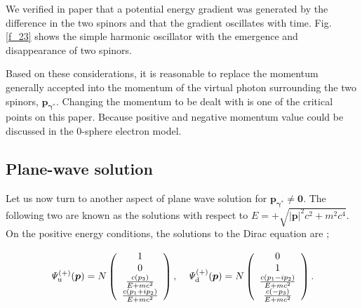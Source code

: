 \documentclass[%
 reprint,
 amsmath,amssymb,
 aps,
]{revtex4-1}
\numberwithin{equation}{section}%
\begin{document}
    We verified in paper \cite{Hanamura1} that a potential energy gradient was generated by the difference in the two spinors and that the gradient oscillates with time. Fig. \ref{f_23} shows the simple harmonic oscillator with the emergence and disappearance of two spinors.


    Based on these considerations, it is reasonable to replace the momentum generally accepted into the momentum of the virtual photon surrounding the two spinors, $ \bm{p_{\gamma^{*}}} $. Changing the momentum to be dealt with is one of the critical points on this paper. Because positive and negative momentum value could be discussed in the 0-sphere electron model. 






\subsection{
    \label{sec:Plane wave solution}
        Plane-wave solution}

    Let us now turn to another aspect of plane wave solution for $ \bm{p_{\gamma^{*}}} \neq \bm{0} $. The following two are known as the solutions with respect to $ E = + \sqrt{ |\bm{p}|^{2} c^{2} + m^{2} c^{4} } $. On the positive energy conditions, the solutions to the Dirac equation are \cite{Griffiths};

        \begin{align}
            {\it\Psi^{(+)}_{\mathrm{u}}} (\bm{p})
            = N
            \left( 
                \begin{array}{c}
                    1 \\
                    0 \\
                    \frac{c ( p_3 )}{E + m c^{2}} \\
                    \frac{c ( p_1 + i p_2 )}{E + m c^{2}} \\
                \end{array}
            \right)
            , \ \ \
            {\it\Psi^{(+)}_{\mathrm{d}}}  (\bm{p})
            = N
            \left( 
                \begin{array}{c}
                    0 \\
                    1 \\
                    \frac{c ( p_1 - i p_2 )}{E + m c^{2}} \\
                    \frac{c ( - p_3 )}{E + m c^{2}}  \\
                \end{array}
            \right)
            .
        \label{e_Psy_6}
        \end{align}
\end{document}
